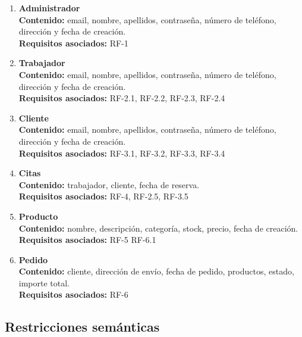 \begin{enumerate}[leftmargin=1.6cm,start=1,label={\bfseries RI-\arabic*.}]
\setlength\itemsep{1em} %
    \item \textbf{Administrador}
    \\\textbf{Contenido:} email, nombre, apellidos, contraseña, número de teléfono, dirección y fecha de creación.
	\\\textbf{Requisitos asociados:} RF-1

	\item \textbf{Trabajador}
    \\\textbf{Contenido:} email, nombre, apellidos, contraseña, número de teléfono, dirección y fecha de creación.
    \\\textbf{Requisitos asociados:} RF-2.1, RF-2.2, RF-2.3, RF-2.4

    \item \textbf{Cliente}
    \\\textbf{Contenido:} email, nombre, apellidos, contraseña, número de teléfono, dirección y fecha de creación.
    \\\textbf{Requisitos asociados:} RF-3.1, RF-3.2, RF-3.3, RF-3.4

    \item \textbf{Citas}
    \\\textbf{Contenido:} trabajador, cliente, fecha de reserva.
    \\\textbf{Requisitos asociados:} RF-4, RF-2.5, RF-3.5\\
    
    \item \textbf{Producto}
    \\\textbf{Contenido:} nombre, descripción, categoría, stock, precio, fecha de creación.
    \\\textbf{Requisitos asociados:} RF-5 RF-6.1\\
    
    \item \textbf{Pedido}
    \\\textbf{Contenido:} cliente, dirección de envío, fecha de pedido, productos, estado, importe total.
    \\\textbf{Requisitos asociados:} RF-6\\
\end{enumerate}

\subsection{Restricciones semánticas}


